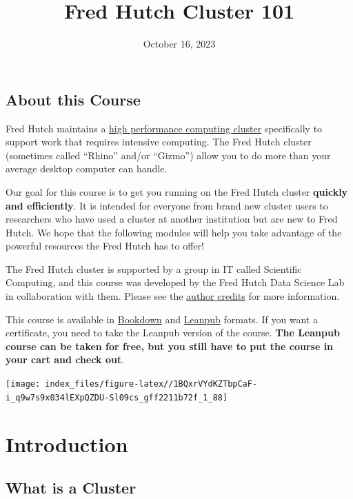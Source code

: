 \documentclass[
]{book}
\title{Fred Hutch Cluster 101}
\author{}
\date{\vspace{-2.5em}October 16, 2023}
\begin{document}
\maketitle

{
\setcounter{tocdepth}{1}
\tableofcontents
}
\hypertarget{about-this-course}{%
\chapter*{About this Course}\label{about-this-course}}

Fred Hutch maintains a \href{https://en.wikipedia.org/wiki/HPCC}{high performance computing cluster} specifically to support work that requires intensive computing. The Fred Hutch cluster (sometimes called ``Rhino'' and/or ``Gizmo'') allow you to do more than your average desktop computer can handle.

Our goal for this course is to get you running on the Fred Hutch cluster \textbf{quickly and efficiently}. It is intended for everyone from brand new cluster users to researchers who have used a cluster at another institution but are new to Fred Hutch. We hope that the following modules will help you take advantage of the powerful resources the Fred Hutch has to offer!

The Fred Hutch cluster is supported by a group in IT called Scientific Computing, and this course was developed by the Fred Hutch Data Science Lab in collaboration with them. Please see the \protect\hyperlink{about-the-authors}{author credits} for more information.

This course is available in \href{https://hutchdatascience.org/FH_Cluster_Guide}{Bookdown} and \href{https://leanpub.com/courses/fredhutch/fredhutchcluster101}{Leanpub} formats. If you want a certificate, you need to take the Leanpub version of the course. \textbf{The Leanpub course can be taken for free, but you still have to put the course in your cart and check out}.

\texttt{[image: index\_files/figure-latex//1BQxrVYdKZTbpCaF-i\_q9w7s9x034lEXpQZDU-Sl09cs\_gff2211b72f\_1\_88]}

\hypertarget{part-introduction}{%
\part*{Introduction}\label{part-introduction}}

\hypertarget{what-is-a-cluster}{%
\chapter{What is a Cluster}\label{what-is-a-cluster}}
\end{document}
